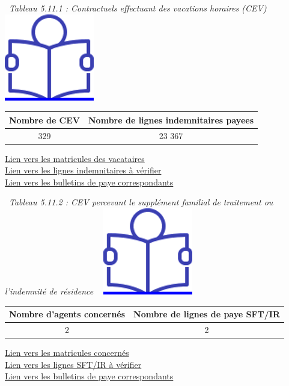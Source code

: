 ~\emph{Tableau 5.11.1 : Contractuels effectuant des vacations horaires
(CEV)} ~
\href{../Docs/Notices/fiche_CEV_horaires.odt}{\includegraphics{icones/Notice.png}}

\begin{longtable}[]{@{}cc@{}}
\toprule
Nombre de CEV & Nombre de lignes indemnitaires payees\tabularnewline
\midrule
\endhead
329 & 23 367\tabularnewline
\bottomrule
\end{longtable}

\href{../Bases/Reglementation/matricules.contractuels.et.vacations.csv}{Lien
vers les matricules des vacataires}\\
\href{../Bases/Reglementation/RI.et.vacations.csv}{Lien vers les lignes
indemnitaires à vérifier}\\
\href{../Bases/Reglementation/Paie_vac_contr.csv}{Lien vers les bulletins
de paye correspondants}

~\emph{Tableau 5.11.2 : CEV percevant le supplément familial de
traitement ou l'indemnité de résidence} ~
\href{../Docs/Notices/fiche_CEV_SFT.odt}{\includegraphics{icones/Notice.png}}

\begin{longtable}[]{@{}cc@{}}
\toprule
Nombre d'agents concernés & Nombre de lignes de paye
SFT/IR\tabularnewline
\midrule
\endhead
2 & 2\tabularnewline
\bottomrule
\end{longtable}

\href{../Bases/Reglementation/matricules.SFT_IR.et.vacations.csv}{Lien vers
les matricules concernés}\\
\href{../Bases/Reglementation/SFT_IR.et.vacations.csv}{Lien vers les lignes
SFT/IR à vérifier}\\
\href{../Bases/Reglementation/Paie_vac_sft_ir.csv}{Lien vers les bulletins
de paye correspondants}

